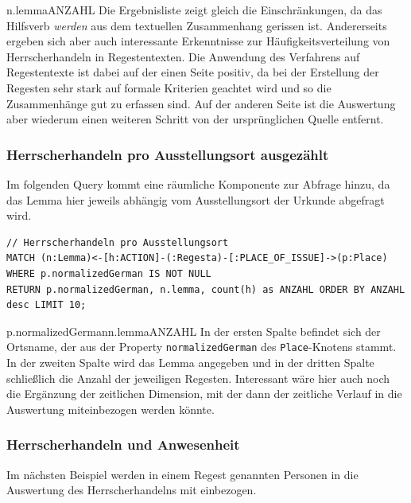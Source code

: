 \textbar n.lemma\textbar ANZAHL\textbar{} Die Ergebnisliste zeigt gleich
die Einschränkungen, da das Hilfsverb \emph{werden} aus dem textuellen
Zusammenhang gerissen ist. Andererseits ergeben sich aber auch
interessante Erkenntnisse zur Häufigkeitsverteilung von Herrscherhandeln
in Regestentexten. Die Anwendung des Verfahrens auf Regestentexte ist
dabei auf der einen Seite positiv, da bei der Erstellung der Regesten
sehr stark auf formale Kriterien geachtet wird und so die Zusammenhänge
gut zu erfassen sind. Auf der anderen Seite ist die Auswertung aber
wiederum einen weiteren Schritt von der ursprünglichen Quelle entfernt.

\hypertarget{herrscherhandeln-pro-ausstellungsort-ausgezuxe4hlt}{%
\subsubsection{Herrscherhandeln pro Ausstellungsort
ausgezählt}\label{herrscherhandeln-pro-ausstellungsort-ausgezuxe4hlt}}

Im folgenden Query kommt eine räumliche Komponente zur Abfrage hinzu, da
das Lemma hier jeweils abhängig vom Ausstellungsort der Urkunde
abgefragt wird.

\begin{verbatim}
// Herrscherhandeln pro Ausstellungsort
MATCH (n:Lemma)<-[h:ACTION]-(:Regesta)-[:PLACE_OF_ISSUE]->(p:Place)
WHERE p.normalizedGerman IS NOT NULL
RETURN p.normalizedGerman, n.lemma, count(h) as ANZAHL ORDER BY ANZAHL desc LIMIT 10;
\end{verbatim}

\textbar p.normalizedGerman\textbar n.lemma\textbar ANZAHL\textbar{} In
der ersten Spalte befindet sich der Ortsname, der aus der Property
\texttt{normalizedGerman} des \texttt{Place}-Knotens stammt. In der
zweiten Spalte wird das Lemma angegeben und in der dritten Spalte
schließlich die Anzahl der jeweiligen Regesten. Interessant wäre hier
auch noch die Ergänzung der zeitlichen Dimension, mit der dann der
zeitliche Verlauf in die Auswertung miteinbezogen werden könnte.

\hypertarget{herrscherhandeln-und-anwesenheit}{%
\subsubsection{Herrscherhandeln und
Anwesenheit}\label{herrscherhandeln-und-anwesenheit}}

Im nächsten Beispiel werden in einem Regest genannten Personen in die
Auswertung des Herrscherhandelns mit einbezogen.


